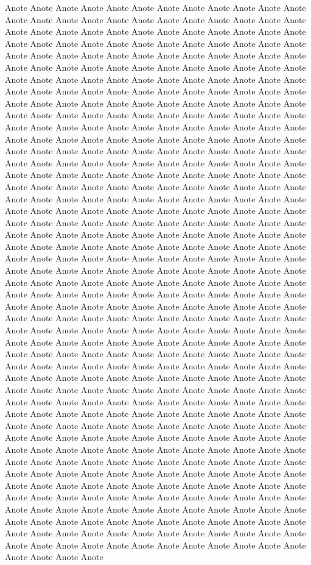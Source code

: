 \documentclass[11pt,a4paper]{book}
\begin{document}
Anote Anote Anote Anote Anote Anote Anote Anote Anote Anote Anote Anote Anote Anote Anote Anote Anote Anote Anote Anote Anote Anote Anote Anote Anote Anote Anote Anote Anote Anote Anote Anote Anote Anote Anote Anote Anote Anote Anote Anote Anote Anote Anote Anote Anote Anote Anote Anote Anote Anote Anote Anote Anote Anote Anote Anote Anote Anote Anote Anote Anote Anote Anote Anote Anote Anote Anote Anote Anote Anote Anote Anote Anote Anote Anote Anote Anote Anote Anote Anote Anote Anote Anote Anote Anote Anote Anote Anote Anote Anote Anote Anote Anote Anote Anote Anote Anote Anote Anote Anote Anote Anote Anote Anote Anote Anote Anote Anote Anote Anote Anote Anote Anote Anote Anote Anote Anote Anote Anote Anote Anote Anote Anote Anote Anote Anote Anote Anote Anote Anote Anote Anote Anote Anote Anote Anote Anote Anote Anote Anote Anote Anote Anote Anote Anote Anote Anote Anote Anote Anote Anote Anote Anote Anote Anote Anote Anote Anote Anote Anote Anote Anote Anote Anote Anote Anote Anote Anote Anote Anote Anote Anote Anote Anote Anote Anote Anote Anote Anote Anote Anote Anote Anote Anote Anote Anote Anote Anote Anote Anote Anote Anote Anote Anote Anote Anote Anote Anote Anote Anote Anote Anote Anote Anote Anote Anote Anote Anote Anote Anote Anote Anote Anote Anote Anote Anote Anote Anote Anote Anote Anote Anote Anote Anote Anote Anote Anote Anote Anote Anote Anote Anote Anote Anote Anote Anote Anote Anote Anote Anote Anote Anote Anote Anote Anote Anote Anote Anote Anote Anote Anote Anote Anote Anote Anote Anote Anote Anote Anote Anote Anote Anote Anote Anote Anote Anote Anote Anote Anote Anote Anote Anote Anote Anote Anote Anote Anote Anote Anote Anote Anote Anote Anote Anote Anote Anote Anote Anote Anote Anote Anote Anote Anote Anote Anote Anote Anote Anote Anote Anote Anote Anote Anote Anote Anote Anote Anote Anote Anote Anote Anote Anote Anote Anote Anote Anote Anote Anote Anote Anote Anote Anote Anote Anote Anote Anote Anote Anote Anote Anote Anote Anote Anote Anote Anote Anote Anote Anote Anote Anote Anote Anote Anote Anote Anote Anote Anote Anote Anote Anote Anote Anote Anote Anote Anote Anote Anote Anote Anote Anote Anote Anote Anote Anote Anote Anote Anote Anote Anote Anote Anote Anote Anote Anote Anote Anote Anote Anote Anote Anote Anote Anote Anote Anote Anote Anote Anote Anote Anote Anote Anote Anote Anote Anote Anote Anote Anote Anote Anote Anote Anote Anote Anote Anote Anote Anote Anote Anote Anote Anote Anote Anote Anote Anote Anote Anote Anote Anote Anote Anote Anote Anote Anote Anote Anote Anote Anote Anote Anote Anote Anote Anote Anote Anote Anote Anote Anote Anote Anote Anote Anote Anote Anote Anote Anote Anote Anote Anote Anote Anote Anote Anote Anote Anote Anote Anote Anote Anote Anote Anote Anote Anote Anote Anote Anote Anote Anote Anote Anote Anote Anote Anote Anote Anote Anote Anote Anote Anote Anote Anote Anote Anote Anote Anote Anote Anote Anote Anote Anote Anote Anote Anote Anote Anote Anote Anote Anote Anote Anote Anote Anote Anote Anote Anote Anote Anote Anote Anote Anote Anote Anote Anote Anote Anote Anote Anote Anote Anote Anote Anote Anote Anote Anote Anote Anote Anote Anote Anote Anote Anote Anote Anote Anote Anote Anote Anote Anote Anote Anote Anote Anote Anote Anote Anote Anote Anote Anote Anote Anote Anote Anote Anote Anote Anote Anote Anote 
\end{document}
